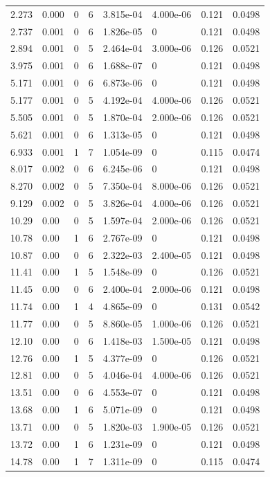 \documentclass[preview]{standalone}
\begin{document}
{{\begin{tabular}{L{1.2cm}C{1.2cm} C{0.3cm}C{0.5cm} C{1.4cm}C{1.4cm} C{1.4cm}C{1.4cm}}
  2.273  &  0.000  & 0     &  6 &  3.815e-04  & 4.000e-06  & 0.121 &  0.0498   \\ 
  2.737  &  0.001  & 0     &  6 &  1.826e-05  & 0  & 0.121 &  0.0498   \\ 
  2.894  &  0.001  & 0     &  5 &  2.464e-04  & 3.000e-06  & 0.126 &  0.0521   \\ 
  3.975  &  0.001  & 0     &  6 &  1.688e-07  & 0  & 0.121 &  0.0498   \\ 
  5.171  &  0.001  & 0     &  6 &  6.873e-06  & 0  & 0.121 &  0.0498   \\ 
  5.177  &  0.001  & 0     &  5 &  4.192e-04  & 4.000e-06  & 0.126 &  0.0521   \\ 
  5.505  &  0.001  & 0     &  5 &  1.870e-04  & 2.000e-06  & 0.126 &  0.0521   \\ 
  5.621  &  0.001  & 0     &  6 &  1.313e-05  & 0  & 0.121 &  0.0498   \\ 
  6.933  &  0.001  & 1     &  7 &  1.054e-09  & 0  & 0.115 &  0.0474   \\ 
  8.017  &  0.002  & 0     &  6 &  6.245e-06  & 0  & 0.121 &  0.0498   \\ 
  8.270  &  0.002  & 0     &  5 &  7.350e-04  & 8.000e-06  & 0.126 &  0.0521   \\ 
  9.129  &  0.002  & 0     &  5 &  3.826e-04  & 4.000e-06  & 0.126 &  0.0521   \\ 
  10.29  &  0.00  & 0     &  5 &  1.597e-04  & 2.000e-06  & 0.126 &  0.0521   \\ 
  10.78  &  0.00  & 1     &  6 &  2.767e-09  & 0  & 0.121 &  0.0498   \\ 
  10.87  &  0.00  & 0     &  6 &  2.322e-03  & 2.400e-05  & 0.121 &  0.0498   \\ 
  11.41  &  0.00  & 1     &  5 &  1.548e-09  & 0  & 0.126 &  0.0521   \\ 
  11.45  &  0.00  & 0     &  6 &  2.400e-04  & 2.000e-06  & 0.121 &  0.0498   \\ 
  11.74  &  0.00  & 1     &  4 &  4.865e-09  & 0  & 0.131 &  0.0542   \\ 
  11.77  &  0.00  & 0     &  5 &  8.860e-05  & 1.000e-06  & 0.126 &  0.0521   \\ 
  12.10  &  0.00  & 0     &  6 &  1.418e-03  & 1.500e-05  & 0.121 &  0.0498   \\ 
  12.76  &  0.00  & 1     &  5 &  4.377e-09  & 0  & 0.126 &  0.0521   \\ 
  12.81  &  0.00  & 0     &  5 &  4.046e-04  & 4.000e-06  & 0.126 &  0.0521   \\ 
  13.51  &  0.00  & 0     &  6 &  4.553e-07  & 0  & 0.121 &  0.0498   \\ 
  13.68  &  0.00  & 1     &  6 &  5.071e-09  & 0  & 0.121 &  0.0498   \\ 
  13.71  &  0.00  & 0     &  5 &  1.820e-03  & 1.900e-05  & 0.126 &  0.0521   \\ 
  13.72  &  0.00  & 1     &  6 &  1.231e-09  & 0  & 0.121 &  0.0498   \\ 
  14.78  &  0.00  & 1     &  7 &  1.311e-09  & 0  & 0.115 &  0.0474   \\ 
\hline 
\end{tabular} 

}}
\end{document}
